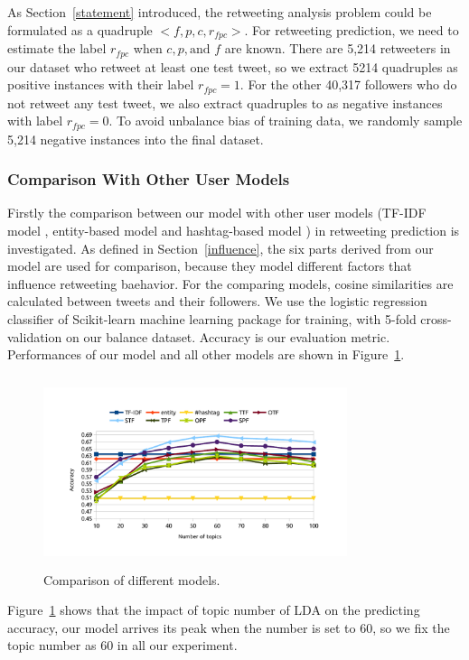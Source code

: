 \documentclass{acm_proc_article-sp}
\begin{document}
As Section~\ref{statement} introduced, the retweeting analysis problem could be formulated as a quadruple $< f, p, c, r_{fpc} > $.
For retweeting prediction, we need to estimate the label $ r_{fpc} $ when $ c, p, \text{and } f $ are known. 
There are 5,214 retweeters in our dataset who retweet at least one test tweet, so we extract 5214 quadruples as positive instances with their label $ r_{fpc}=1 $.
For the other 40,317 followers who do not retweet any test tweet, we also extract quadruples to as negative instances with label $ r_{fpc}=0 $.
To avoid unbalance bias of training data, we randomly sample 5,214 negative instances into the final dataset.

\subsubsection{Comparison With Other User Models}
\label{comparison}
Firstly the comparison between our model with other user models (TF-IDF model \cite{Luo:2013RMF}, entity-based model and hashtag-based model \cite{Abel:2011AUM}) in retweeting prediction is investigated.
As defined in Section~\ref{influence}, the six parts derived from our model are used for comparison, because they model different factors that influence retweeting baehavior.
For the comparing models, cosine similarities are calculated between tweets and their followers.
We use the logistic regression classifier of Scikit-learn machine learning package \cite{scikit-learn} for training, with 5-fold cross-validation on our balance dataset. Accuracy is our evaluation metric.
Performances of our model and all other models are shown in Figure~\ref{fig:graph7}.
\begin{figure}[htb]
\centering
\includegraphics[width=3.5in,height=2.2in]{comparison.pdf}
\caption{Comparison of different models.}
\label{fig:graph7}
\end{figure}
Figure~\ref{fig:graph7} shows that the impact of topic number of LDA on the predicting accuracy, our model arrives its peak when the number is set to 60, so we fix the topic number as 60 in all our experiment.
\end{document}
